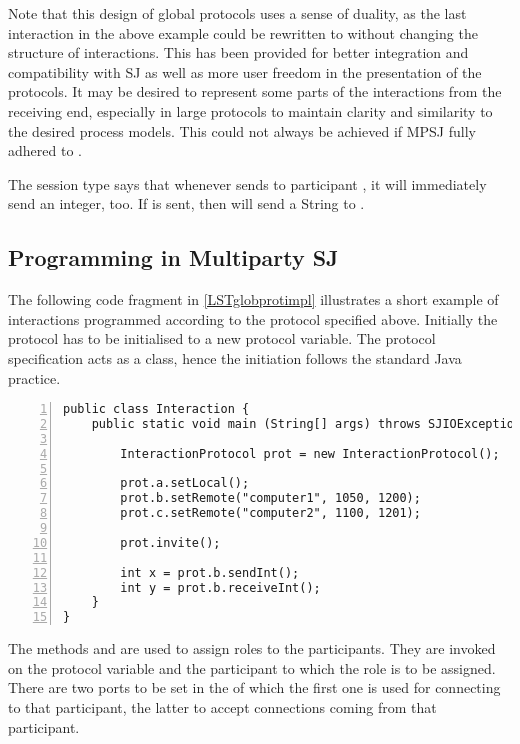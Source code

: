 Note that this design of global protocols uses a sense of duality, as the last interaction in the above example could be rewritten to  without changing the structure of interactions. This has been provided for better integration and compatibility with SJ as well as more user freedom in the presentation of the protocols. It may be desired to represent some parts of the interactions from the receiving end, especially in large protocols to maintain clarity and similarity to the desired process models. This could not always be achieved if MPSJ fully adhered to \cite{multiparty_sess_types}.

The session type  says that whenever  sends  to participant , it will immediately send an integer, too. If  is sent, then  will send a String to . 

\subsection{Programming in Multiparty SJ}

The following code fragment in \autoref{LSTglobprotimpl} illustrates a short example of interactions programmed according to the protocol specified above. Initially the protocol has to be initialised to a new protocol variable. The protocol specification acts as a class, hence the initiation follows the standard Java practice.

\begin{lstlisting}[basicstyle=\LISTINGSTYLE, numbers=left, caption={Interaction implementation of the protocol from \autoref{subsec:globprotdecl}}, label={LSTglobprotimpl}]
public class Interaction {
	public static void main (String[] args) throws SJIOException {		

		InteractionProtocol prot = new InteractionProtocol();
	
		prot.a.setLocal();
		prot.b.setRemote("computer1", 1050, 1200);
		prot.c.setRemote("computer2", 1100, 1201);

		prot.invite();		

		int x = prot.b.sendInt();
		int y = prot.b.receiveInt();
	}
}
\end{lstlisting}

The methods  and  are used to assign roles to the participants. They are invoked on the protocol variable and the participant to which the role is to be assigned. There are two ports to be set in the  of which the first one is used for connecting to that participant, the latter to accept connections coming from that participant. 

